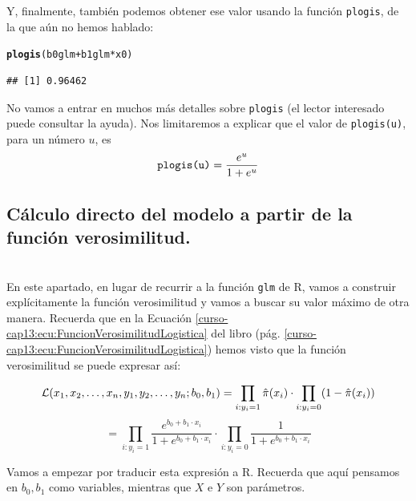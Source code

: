\documentclass[10pt,a4paper]{article}\usepackage[]{graphicx}\usepackage[]{color}
\makeatletter
\newcommand{\hlopt}[1]{\textcolor[rgb]{0,0,0}{#1}}%
\newcommand{\hlstd}[1]{\textcolor[rgb]{0.345,0.345,0.345}{#1}}%
\newcommand{\hlkwd}[1]{\textcolor[rgb]{0.737,0.353,0.396}{\textbf{#1}}}%
\newenvironment{kframe}{%
 \def\at@end@of@kframe{}%
 \ifinner\ifhmode%
  \def\at@end@of@kframe{\end{minipage}}%
  \begin{minipage}{\columnwidth}%
 \fi\fi%
 \def\FrameCommand##1{\hskip\@totalleftmargin \hskip-\fboxsep
 \colorbox{shadecolor}{##1}\hskip-\fboxsep
     \hskip-\linewidth \hskip-\@totalleftmargin \hskip\columnwidth}%
 \MakeFramed {\advance\hsize-\width
   \@totalleftmargin\z@ \linewidth\hsize
   \@setminipage}}%
 {\par\unskip\endMakeFramed%
 \at@end@of@kframe}
\newenvironment{knitrout}{}{} %
\makeatother
\begin{document}
Y, finalmente, también podemos obtener ese valor usando la función {\tt plogis}, de la que aún no hemos hablado:

\begin{knitrout}
\color{fgcolor}\begin{kframe}
\begin{alltt}
\hlkwd{plogis}\hlstd{(b0glm} \hlopt{+} \hlstd{b1glm} \hlopt{*} \hlstd{x0)}
\end{alltt}
\begin{verbatim}
## [1] 0.96462
\end{verbatim}
\end{kframe}
\end{knitrout}
No vamos a entrar en muchos más detalles sobre {\tt plogis} (el lector interesado puede consultar la ayuda). Nos limitaremos a explicar que el valor de {\tt plogis(u)}, para un número $u$, es
\[\mbox{\tt plogis(u)} = \dfrac{e^u}{1 + e^u}\]


\subsection{Cálculo directo del modelo a partir de la función verosimilitud.}
\label{tut13:subsec:calculoDirectoFuncionVerosimilitud}
\\

En este apartado, en lugar de recurrir a la función {\tt glm} de R, vamos a construir explícitamente la función verosimilitud y vamos a buscar su valor máximo de otra manera. Recuerda que en la Ecuación \ref{curso-cap13:ecu:FuncionVerosimilitudLogistica} del libro (pág. \ref{curso-cap13:ecu:FuncionVerosimilitudLogistica}) hemos visto que la función verosimilitud se puede expresar así:

\[
{\cal L}(x_1,x_2,\ldots,x_n, y_1, y_2, \ldots, y_n;b_0, b_1) =\prod_{i:y_i=1}\hat{\pi}(x_i)  \cdot \prod_{i:y_i=0}(1 - \hat{\pi}(x_i))
\]
\[
=\prod_{i:y_i=1} \dfrac{e^{b_0+b_1\cdot x_i}}{1+e^{b_0+b_1\cdot x_i}}
\cdot \prod_{i:y_i=0}\dfrac{1}{1+e^{b_0+b_1\cdot x_i}}
\]

Vamos a empezar por traducir esta expresión a R. Recuerda que aquí pensamos en $b_0, b_1$ como variables, mientras que $X$ e $Y$ son parámetros.
\end{document}
